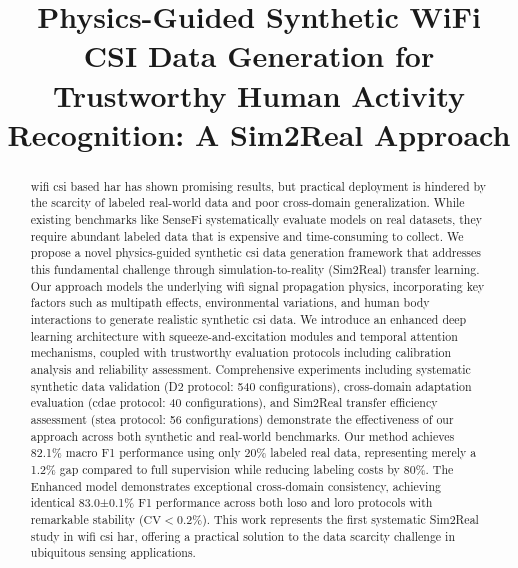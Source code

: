 \documentclass[journal]{IEEEtran}
\begin{document}
\title{Physics-Guided Synthetic WiFi CSI Data Generation for Trustworthy Human Activity Recognition: A Sim2Real Approach}

\author{
}

\maketitle

\begin{abstract}

\gls{wifi} \gls{csi} based \gls{har} has shown promising results, but practical deployment is hindered by the scarcity of labeled real-world data and poor cross-domain generalization. While existing benchmarks like SenseFi systematically evaluate models on real datasets, they require abundant labeled data that is expensive and time-consuming to collect. We propose a novel physics-guided synthetic \gls{csi} data generation framework that addresses this fundamental challenge through simulation-to-reality (Sim2Real) transfer learning. Our approach models the underlying \gls{wifi} signal propagation physics, incorporating key factors such as multipath effects, environmental variations, and human body interactions to generate realistic synthetic \gls{csi} data. We introduce an enhanced deep learning architecture with squeeze-and-excitation modules and temporal attention mechanisms, coupled with trustworthy evaluation protocols including calibration analysis and reliability assessment. Comprehensive experiments including systematic synthetic data validation (D2 protocol: 540 configurations), cross-domain adaptation evaluation (\gls{cdae} protocol: 40 configurations), and Sim2Real transfer efficiency assessment (\gls{stea} protocol: 56 configurations) demonstrate the effectiveness of our approach across both synthetic and real-world benchmarks. Our method achieves 82.1\% macro F1 performance using only 20\% labeled real data, representing merely a 1.2\% gap compared to full supervision while reducing labeling costs by 80\%. The Enhanced model demonstrates exceptional cross-domain consistency, achieving identical 83.0±0.1\% F1 performance across both \gls{loso} and \gls{loro} protocols with remarkable stability ($\text{CV}<0.2\%$). This work represents the first systematic Sim2Real study in \gls{wifi} \gls{csi} \gls{har}, offering a practical solution to the data scarcity challenge in ubiquitous sensing applications.
\end{abstract}
\end{document}
